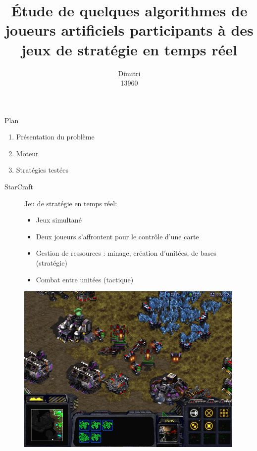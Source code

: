 \documentclass[french]{beamer}
\title{Étude de quelques algorithmes de joueurs artificiels participants à des jeux de stratégie en temps réel}
\author{Dimitri \bsc{Cocheril-Crèvecœur} \\ 13960}
\begin{document}
\begin{frame}[plain]
    \maketitle
\end{frame}
\begin{frame}{Plan}
	\begin{enumerate}
		\item Présentation du problème
		\item Moteur
		\item Stratégies testées
	\end{enumerate}
\end{frame}
\begin{frame}{StarCraft}
	\begin{figure}
		\centering
		\begin{minipage}{0.5\textwidth}
			Jeu de stratégie en temps réel:
			\begin{itemize}
				\item Jeux simultané
				\item Deux joueurs s'affrontent pour le contrôle d'une carte
				\item Gestion de ressources : minage, création d'unitées, de bases (stratégie)
				\item Combat entre unitées (tactique)
			\end{itemize}
		\end{minipage}\hfill
		\begin{minipage}{0.5\textwidth}
			\centering
			\includegraphics[width=0.99\textwidth]{screen_starcraft.png}
		\end{minipage}
	\end{figure}
\end{frame}
\end{document}
